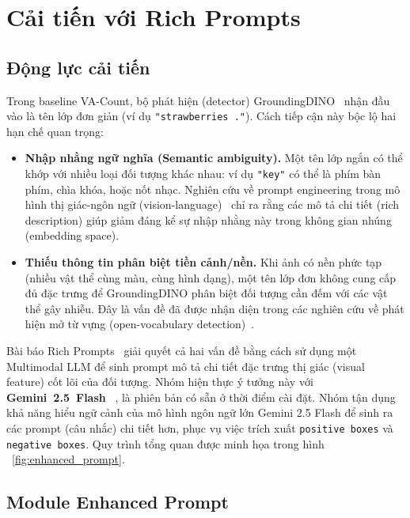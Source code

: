 \documentclass[a4paper,12pt]{report}
\numberwithin{figure}{chapter}
\numberwithin{table}{chapter}
\begin{document}
\section{Cải tiến với Rich Prompts}
\label{sec:rich-prompts}

\subsection{Động lực cải tiến}

Trong baseline VA-Count, bộ phát hiện (detector) GroundingDINO~\cite{groundingdino} nhận đầu vào là tên lớp đơn giản (ví dụ \texttt{"strawberries ."}). Cách tiếp cận này bộc lộ hai hạn chế quan trọng:

\begin{itemize}
    \item \textbf{Nhập nhằng ngữ nghĩa (Semantic ambiguity).} Một tên lớp ngắn có thể khớp với nhiều loại đối tượng khác nhau: ví dụ \texttt{"key"} có thể là phím bàn phím, chìa khóa, hoặc nốt nhạc. Nghiên cứu về prompt engineering trong mô hình thị giác-ngôn ngữ (vision-language)~\cite{coop} chỉ ra rằng các mô tả chi tiết (rich description) giúp giảm đáng kể sự nhập nhằng này trong không gian nhúng (embedding space).
    \item \textbf{Thiếu thông tin phân biệt tiền cảnh/nền.} Khi ảnh có nền phức tạp (nhiều vật thể cùng màu, cùng hình dạng), một tên lớp đơn không cung cấp đủ đặc trưng để GroundingDINO phân biệt đối tượng cần đếm với các vật thể gây nhiễu. Đây là vấn đề đã được nhận diện trong các nghiên cứu về phát hiện mở từ vựng (open-vocabulary detection)~\cite{ovdet_survey}.
\end{itemize}
Bài báo Rich Prompts~\cite{richprompts} giải quyết cả hai vấn đề bằng cách sử dụng một Multimodal LLM để sinh prompt mô tả chi tiết đặc trưng thị giác (visual feature) cốt lõi của đối tượng. Nhóm hiện thực ý tưởng này với \textbf{Gemini~2.5~Flash} ~\cite{gemini}, là phiên bản có sẵn ở thời điểm cài đặt. Nhóm tận dụng khả năng hiểu ngữ cảnh của mô hình ngôn ngữ lớn Gemini 2.5 Flash để sinh ra các prompt (câu nhắc) chi tiết hơn, phục vụ việc trích xuất \texttt{positive boxes} và \texttt{negative boxes}. Quy trình tổng quan được minh họa trong hình ~\ref{fig:enhanced_prompt}.

\subsection{Module Enhanced Prompt}
\label{subsec:enhanced-prompt}
\end{document}
